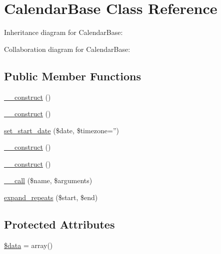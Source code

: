 \hypertarget{classCalendarBase}{
\section{CalendarBase Class Reference}
\label{classCalendarBase}
}


Inheritance diagram for CalendarBase:


Collaboration diagram for CalendarBase:
\subsection*{Public Member Functions}
\begin{DoxyCompactItemize}
\item 
\hyperlink{classCalendarBase_a095c5d389db211932136b53f25f39685}{\_\-\_\-construct} ()
\item 
\hyperlink{classCalendarBase_a095c5d389db211932136b53f25f39685}{\_\-\_\-construct} ()
\item 
\hyperlink{classCalendarBase_ab7f85a8d89ab19faaed7ce7e7616ac7d}{set\_\-start\_\-date} (\$date, \$timezone='')
\item 
\hyperlink{classCalendarBase_a095c5d389db211932136b53f25f39685}{\_\-\_\-construct} ()
\item 
\hyperlink{classCalendarBase_a095c5d389db211932136b53f25f39685}{\_\-\_\-construct} ()
\item 
\hyperlink{classCalendarBase_a3815af62ed9d37b2dcaa175379bbfeca}{\_\-\_\-call} (\$name, \$arguments)
\item 
\hyperlink{classCalendarBase_a874ebcd7e488d259eebddc1a2bc83980}{expand\_\-repeats} (\$start, \$end)
\end{DoxyCompactItemize}
\subsection*{Protected Attributes}
\begin{DoxyCompactItemize}
\item 
\hyperlink{classCalendarBase_a6efc15b5a2314dd4b5aaa556a375c6d6}{\$data} = array()
\end{DoxyCompactItemize}


